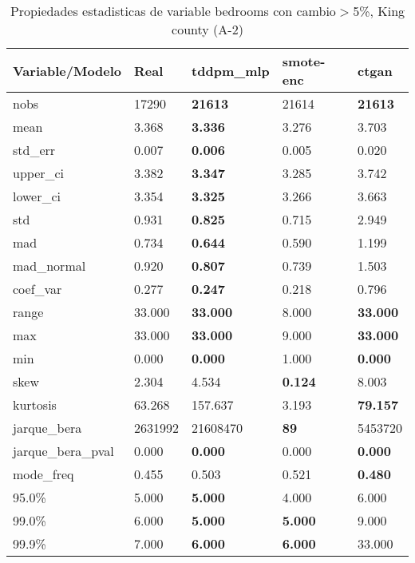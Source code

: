 \begin{table}[H]
\centering
\fontsize{8}{14}\selectfont
\caption{Propiedades estadisticas de variable bedrooms con cambio\ensuremath{>}5\%, King county (A-2)}
\label{table-stats-king county-a-2-bedrooms-short}
\begin{tabular}{|l|m{10em}|m{10em}|m{10em}|m{10em}|}
\hline
 \rowcolor[gray]{0.8}
Variable/Modelo & Real & tddpm\_mlp & smote-enc & ctgan \\
\hline nobs & 17290 & \bfseries 21613 & \cellcolor[rgb]{0.9, 0.54, 0.52} 21614 & \bfseries 21613 \\
\hline mean & 3.368 & \bfseries 3.336 & 3.276 & \cellcolor[rgb]{0.9, 0.54, 0.52} 3.703 \\
\hline std\_err & 0.007 & \bfseries 0.006 & 0.005 & \cellcolor[rgb]{0.9, 0.54, 0.52} 0.020 \\
\hline upper\_ci & 3.382 & \bfseries 3.347 & 3.285 & \cellcolor[rgb]{0.9, 0.54, 0.52} 3.742 \\
\hline lower\_ci & 3.354 & \bfseries 3.325 & 3.266 & \cellcolor[rgb]{0.9, 0.54, 0.52} 3.663 \\
\hline std & 0.931 & \bfseries 0.825 & 0.715 & \cellcolor[rgb]{0.9, 0.54, 0.52} 2.949 \\
\hline mad & 0.734 & \bfseries 0.644 & 0.590 & \cellcolor[rgb]{0.9, 0.54, 0.52} 1.199 \\
\hline mad\_normal & 0.920 & \bfseries 0.807 & 0.739 & \cellcolor[rgb]{0.9, 0.54, 0.52} 1.503 \\
\hline coef\_var & 0.277 & \bfseries 0.247 & 0.218 & \cellcolor[rgb]{0.9, 0.54, 0.52} 0.796 \\
\hline range & 33.000 & \bfseries 33.000 & \cellcolor[rgb]{0.9, 0.54, 0.52} 8.000 & \bfseries 33.000 \\
\hline max & 33.000 & \bfseries 33.000 & \cellcolor[rgb]{0.9, 0.54, 0.52} 9.000 & \bfseries 33.000 \\
\hline min & 0.000 & \bfseries 0.000 & \cellcolor[rgb]{0.9, 0.54, 0.52} 1.000 & \bfseries 0.000 \\
\hline skew & 2.304 & 4.534 & \bfseries 0.124 & \cellcolor[rgb]{0.9, 0.54, 0.52} 8.003 \\
\hline kurtosis & 63.268 & \cellcolor[rgb]{0.9, 0.54, 0.52} 157.637 & 3.193 & \bfseries 79.157 \\
\hline jarque\_bera & 2631992 & \cellcolor[rgb]{0.9, 0.54, 0.52} 21608470 & \bfseries 89 & 5453720 \\
\hline jarque\_bera\_pval & 0.000 & \bfseries 0.000 & \cellcolor[rgb]{0.9, 0.54, 0.52} 0.000 & \bfseries 0.000 \\
\hline mode\_freq & 0.455 & 0.503 & \cellcolor[rgb]{0.9, 0.54, 0.52} 0.521 & \bfseries 0.480 \\
\hline 95.0\% & 5.000 & \bfseries 5.000 & \cellcolor[rgb]{0.9, 0.54, 0.52} 4.000 & \cellcolor[rgb]{0.9, 0.54, 0.52} 6.000 \\
\hline 99.0\% & 6.000 & \bfseries 5.000 & \bfseries 5.000 & \cellcolor[rgb]{0.9, 0.54, 0.52} 9.000 \\
\hline 99.9\% & 7.000 & \bfseries 6.000 & \bfseries 6.000 & \cellcolor[rgb]{0.9, 0.54, 0.52} 33.000 \\
\hline
\end{tabular}
\end{table}
